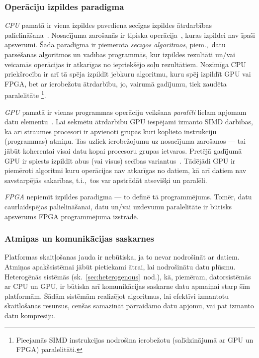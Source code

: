 \subsubsection*{Operāciju izpildes paradigma}
\emph{CPU} pamatā ir viena izpildes pavediena secīgas izpildes ātrdarbības
palielināšana~\cite{Owens-GPU}.
Nosacījuma zarošanās ir tipiska operācija~\cite{Flynn-arch}\cite{Patterson},
kuras izpildei nav īpaši apsvērumi.
Šāda paradigma ir piemērota \emph{secīgos algoritmos},
piem.,~datu parsēšanas algoritmos un vadības programmās,
kur izpildes rezultāti un/vai veicamās operācijas ir atkarīgas
no iepriekšējo soļu rezultātiem. Nozīmīga CPU priekšrocība ir arī tā spēja
izpildīt jebkuru algoritmu, kuru spēj izpildīt GPU vai FPGA, bet ar
ierobežotu ātrdarbību, jo, vairumā gadījumu, tiek zaudēta paralelitāte%
\footnote{Pieejamās SIMD instrukcijas nodrošina
	ierobežotu (salīdzinājumā ar GPU un FPGA) paralelitāti.}.

\emph{GPU} pamatā ir vienas programmas operāciju veikšana \emph{paralēli}
lielam apjomam
datu elementu~\cite{Fatahalian}\cite{Owens-GPU}.
Lai sekmētu ātrdarbību GPU iespējami izmanto SIMD darbības,
kā arī straumes procesori ir apvienoti grupās kuri koplieto instrukciju
(programmas) atmiņu. Tas uzliek ierobežojumu uz nosacījuma zarošanos ---
tai jābūt koherentai visai datu kopai procesoru grupas ietvaros. Pretējā
gadījumā GPU ir spiests izpildīt abus (vai visus) secības variantus~\cite{Owens-GPU}.
Tādējādi GPU ir piemēroti algoritmi kuru operācijas nav atkarīgas no datiem,
kā arī datiem nav savstarpējās sakarības, t.i.,~tos var apstrādāt atsevišķi
un paralēli.

\emph{FPGA} nepiemīt izpildes paradigma --- to definē tā programmējums.
Tomēr, datu caurlaidspējas palielināšanai,
datu un/vai uzdevumu paralelitāte ir būtisks apsvērums
FPGA programmējuma izstrādē.

\subsubsection*{Atmiņas un komunikācijas saskarnes}
Platformas skaitļošanas jauda ir nebūtiska, ja to nevar nodrošināt ar datiem.
Atmiņas apakšsistēmai jābūt pietiekami ātrai, lai nodrošinātu datu plūsmu.
Heterogēnās sistēmās (sk.~\ref{sec:heterogenous}~nod.), kā, piemēram,
datorsistēmās ar CPU un GPU, ir būtiska arī komunikācijas saskarne datu
apmaiņai starp šīm platformām. Šādām sistēmām realizējot algoritmus,
lai efektīvi izmantotu skaitļošanas resursus, cenšas samazināt pārraidāmo
datu apjomu, vai pat izmanto datu kompresiju.
\cite{ACDA}\cite{OpenCL-book}

